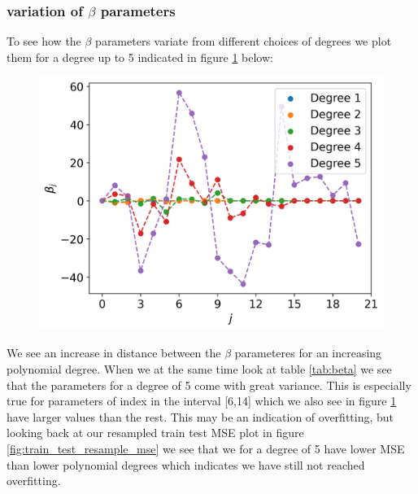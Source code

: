 \documentclass[12pt]{article}
\begin{document}
\subsubsection{variation of $\beta$ parameters}

To see how the $\beta$ parameters variate from different choices of degrees we plot them for a degree up to 5 indicated in figure \ref{fig:beta} below:
\begin{figure}[H]
  \centering
  \includegraphics[width=.7\textwidth]{../figures/beta_degree.png}
  \caption{}
  \label{fig:beta}
\end{figure}
We see an increase in distance between the $\beta$ parameteres for an increasing polynomial degree. When we at the same time look at table \ref{tab:beta} we see that the parameters for a degree of 5 come with great variance. This is especially true for parameters of index in the interval [6,14] which we also see in figure \ref{fig:beta} have larger values than the rest. This may be an indication of overfitting, but looking back at our resampled train test MSE plot in figure \ref{fig:train_test_resample_mse} we see that we for a degree of 5 have lower MSE than lower polynomial degrees which indicates we have still not reached overfitting.
\end{document}

